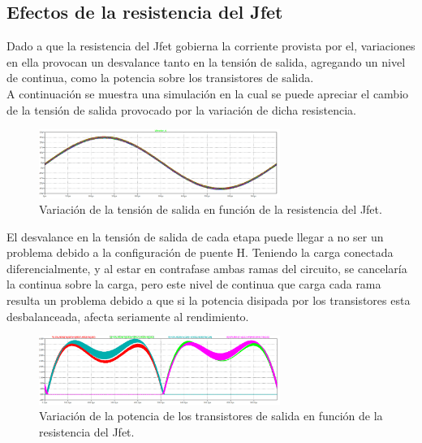 \subsection{Efectos de la resistencia del Jfet}
Dado a que la resistencia del Jfet gobierna la corriente provista por el, variaciones en ella provocan un desvalance tanto en la tensión de salida, agregando un nivel de continua, como la potencia sobre los transistores de salida.\\
A continuación se muestra una simulación en la cual se puede apreciar el cambio de la tensión de salida provocado por la variación de dicha resistencia.
 \begin{figure}[H]
\centering
	\includegraphics[width=0.7\textwidth]{ImagenesSimulaciones/jfetvar1.png}
	\caption{Variación de la tensión de salida en función de la resistencia del Jfet.}
	\label{fig:mcvl}
\end{figure}
El desvalance en la tensión de salida de cada etapa puede llegar a no ser un problema debido a la configuración de puente H. Teniendo la carga conectada diferencialmente, y al estar en contrafase ambas ramas del circuito, se cancelaría la continua sobre la carga, pero este nivel de continua que carga cada rama resulta un problema debido a que si la potencia disipada por los transistores esta desbalanceada, afecta seriamente al rendimiento.
 \begin{figure}[H]
\centering
	\includegraphics[width=0.7\textwidth]{ImagenesSimulaciones/DesvalanceP.png}
	\caption{Variación de la potencia de los transistores de salida en función de la resistencia del Jfet.}
	\label{fig:mcPl}
\end{figure} 